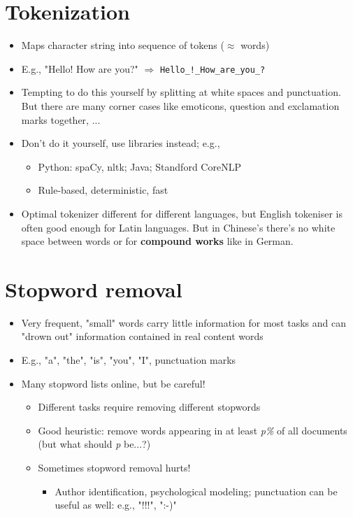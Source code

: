 \documentclass[11pt]{article}
\begin{document}
\section*{Tokenization}
\begin{itemize}
	\item Maps character string into sequence of tokens ($\approx$ words)
	\item E.g., "Hello! How are you?" $\Rightarrow$ \verb|Hello_!_How_are_you_?|
	\item Tempting to do this yourself by splitting at white spaces and punctuation. But there are many corner cases like emoticons, question and exclamation marks together, ...
	\item Don't do it yourself, use libraries instead; e.g., 
		\begin{itemize}
			\item Python: spaCy, nltk; Java; Standford CoreNLP
			\item Rule-based, deterministic, fast
		\end{itemize}
	\item Optimal tokenizer different for different languages, but English tokeniser is often good enough for Latin languages. But in Chinese's there's no white space between words or for \textbf{compound works} like in German.
\end{itemize}

\section*{Stopword removal}
\begin{itemize}
	\item Very frequent, "small" words carry little information for most tasks and can "drown out" information contained in real content words
	\item E.g., "a", "the", "is", "you", "I", punctuation marks
	\item Many stopword lists online, but be careful!
		\begin{itemize}
			\item Different tasks require removing different stopwords
			\item Good heuristic: remove words appearing in at least \textit{p\%} of all documents (but what should \textit{p} be...?)
			\item Sometimes stopword removal hurts!
			\begin{itemize}
				\item Author identification, psychological modeling; punctuation can be useful as well: e.g., "!!!", ":-)"
			\end{itemize}
		\end{itemize}
\end{itemize}
\end{document}
